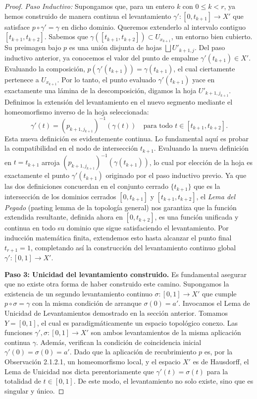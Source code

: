 \documentclass[11pt,a4paper]{article}
\theoremstyle{definition}
\theoremstyle{remark}
\numberwithin{equation}{section}
\begin{document}
\begin{proof}
\textit{Paso Inductivo:} Supongamos que, para un entero $k$ con $0 \leq k < r$, ya hemos construido de manera continua el levantamiento $\gamma': [0, t_{k+1}] \to X'$ que satisface $p \circ \gamma' = \gamma$ en dicho dominio. Queremos extenderlo al intervalo contiguo $[t_{k+1}, t_{k+2}]$.
Sabemos que $\gamma([t_{k+1}, t_{k+2}]) \subset U_{x_{k+1}}$, un entorno bien cubierto. Su preimagen bajo $p$ es una unión disjunta de hojas $\bigsqcup U'_{k+1, j}$. Del paso inductivo anterior, ya conocemos el valor del punto de empalme $\gamma'(t_{k+1}) \in X'$. Evaluando la composición, $p(\gamma'(t_{k+1})) = \gamma(t_{k+1})$, el cual ciertamente pertenece a $U_{x_{k+1}}$. Por lo tanto, el punto evaluado $\gamma'(t_{k+1})$ yace en exactamente una lámina de la descomposición, digamos la hoja $U'_{k+1, j_{k+1}}$.
Definimos la extensión del levantamiento en el nuevo segmento mediante el homeomorfismo inverso de la hoja seleccionada:
\begin{equation}
\gamma'(t) = (p_{k+1, j_{k+1}})^{-1}(\gamma(t)) \quad \text{para todo } t \in [t_{k+1}, t_{k+2}].
\end{equation}
Esta nueva definición es evidentemente continua. Lo fundamental aquí es probar la compatibilidad en el nodo de intersección $t_{k+1}$. Evaluando la nueva definición en $t = t_{k+1}$ arroja $(p_{k+1, j_{k+1}})^{-1}(\gamma(t_{k+1}))$, lo cual por elección de la hoja es exactamente el punto $\gamma'(t_{k+1})$ originado por el paso inductivo previo. Ya que las dos definiciones concuerdan en el conjunto cerrado $\{ t_{k+1} \}$ que es la intersección de los dominios cerrados $[0, t_{k+1}]$ y $[t_{k+1}, t_{k+2}]$, el \textit{Lema del Pegado} (pasting lemma de la topología general) nos garantiza que la función extendida resultante, definida ahora en $[0, t_{k+2}]$, es una función unificada y continua en todo su dominio que sigue satisfaciendo el levantamiento.
Por inducción matemática finita, extendemos esto hasta alcanzar el punto final $t_{r+1} = 1$, completando así la construcción del levantamiento continuo global $\gamma': [0,1] \to X'$.

\textbf{Paso 3: Unicidad del levantamiento construido.}
Es fundamental asegurar que no existe otra forma de haber construido este camino. Supongamos la existencia de un segundo levantamiento continuo $\sigma: [0,1] \to X'$ que cumple $p \circ \sigma = \gamma$ con la misma condición de arranque $\sigma(0) = a'$. Invocamos el Lema de Unicidad de Levantamientos demostrado en la sección anterior. Tomamos $Y = [0,1]$, el cual es paradigmáticamente un espacio topológico conexo. Las funciones $\gamma', \sigma: [0,1] \to X'$ son ambos levantamientos de la misma aplicación continua $\gamma$. Además, verifican la condición de coincidencia inicial $\gamma'(0) = \sigma(0) = a'$. Dado que la aplicación de recubrimiento $p$ es, por la Observación 2.1.2.1, un homeomorfismo local, y el espacio $X'$ es de Hausdorff, el Lema de Unicidad nos dicta perentoriamente que $\gamma'(t) = \sigma(t)$ para la totalidad de $t \in [0,1]$. De este modo, el levantamiento no solo existe, sino que es singular y único.
\end{proof}
\end{document}
